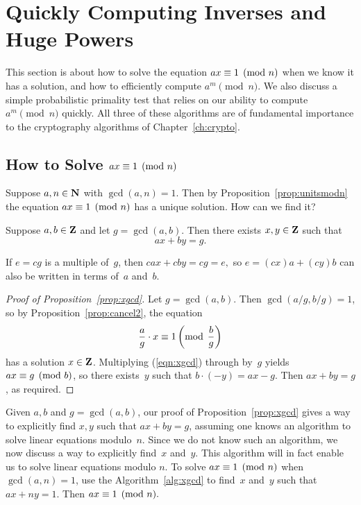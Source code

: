 \section{Quickly Computing Inverses and Huge Powers}
\label{sec:arith_mod_n}
This section is about how to solve the equation $ax\equiv 1\pmod{n}$
when we know it has a solution, and how to efficiently compute
$a^m\pmod{n}$.  We also discuss a simple probabilistic primality
test that relies on our ability to
compute $a^m\pmod{n}$ quickly.  All three of these algorithms are of
fundamental importance to the cryptography algorithms of
Chapter~\ref{ch:crypto}.


\subsection{How to Solve $ax\equiv 1\pmod{n}$}
Suppose $a, n\in\mathbf{N}$ with $\gcd(a,n)=1$.  Then
by Proposition~\ref{prop:unitsmodn}
the equation $ax\equiv 1\pmod{n}$ has a unique solution.
How can we find it?

\begin{proposition}
\label{prop:xgcd}
Suppose $a,b\in\mathbf{Z}$ and let $g=\gcd(a,b)$. Then
there exists $x,y\in\mathbf{Z}$ such that
$$
   ax + by = g.
$$
\end{proposition}
\begin{remark}
If $e=cg$ is a multiple of~$g$, then
$cax + cby = cg = e,$ so $e = (cx)a+(cy)b$ can
also be written in terms of~$a$ and~$b$.
\end{remark}

\begin{proof}[Proof of Proposition~\ref{prop:xgcd}]
  Let $g=\gcd(a,b)$.  Then
  $\gcd(a/g,b/g)=1$, so by Proposition~\ref{prop:cancel2},
 the equation
\begin{equation}\label{eqn:xgcd}
\frac{a}{g}\cdot x\equiv 1\left({\rm mod} \hspace{1ex}\frac{b}{g}\right)
\end{equation}
has a solution $x\in\mathbf{Z}$.  Multiplying (\ref{eqn:xgcd}) through by~$g$
yields $ax \equiv g \pmod{b}$, so there exists~$y$ such that
  $b\cdot (-y) = ax-g$.   Then $ax+by = g$, as required.
\end{proof}

Given $a,b$ and $g=\gcd(a,b)$, our proof of
Proposition~\ref{prop:xgcd} gives a way to explicitly find $x,y$ such
that $ax+by=g$, assuming one knows an algorithm to solve linear
equations modulo~$n$. Since we do not know such an algorithm, we now
discuss a way to explicitly find~$x$ and~$y$.  This algorithm
will in fact enable us to solve linear equations modulo $n$. To solve
$ax\equiv 1\pmod{n}$ when $\gcd(a,n)=1$, use the Algorithm~\ref{alg:xgcd} to
find~$x$ and~$y$ such that $ax+ny = 1$.  Then $ax\equiv 1\pmod{n}.$

